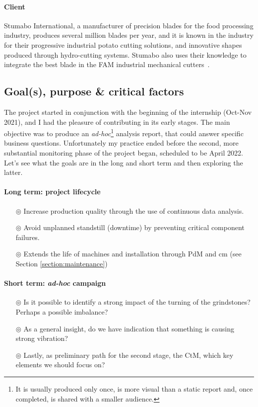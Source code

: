 \paragraph{Client} Stumabo International, a manufacturer of precision blades for the food processing industry, produces several million blades per year, 
and it is known in the industry for their progressive industrial potato cutting solutions, and innovative shapes produced through hydro-cutting systems.
Stumabo also uses their knowledge to integrate the best blade in the FAM industrial mechanical cutters~\cite{Misc:stumabo_en_website}.

\subsection{Goal(s), purpose \& critical factors}
The project started in conjunction with the beginning of the internship (Oct-Nov 2021), and I had the pleasure of contributing in its early stages.
The main objective was to produce an \textit{ad-hoc}\footnote{It is usually produced only once, is more visual than a static report and, once completed, is shared with a smaller audience.} 
analysis report, that could answer specific business questions.
Unfortunately my practice ended before the second, more substantial monitoring phase of the project began, scheduled to be April 2022.
Let's see what the goals are in the long and short term and then exploring the latter.
\paragraph{Long term: project lifecycle}
\begin{itemize}
    \item[$\circledcirc$] Increase production quality through the use of continuous data analysis.
    \item[$\circledcirc$] Avoid unplanned standstill (downtime) by preventing critical component failures.
    \item[$\circledcirc$] Extends the life of machines and installation through \acl{PdM} and \acl{cm} (see Section \ref{section:maintenance})
\end{itemize}
\paragraph{Short term: \textit{ad-hoc} campaign}
\begin{itemize}
    \item[$\circledcirc$] Is  it possible to identify a strong impact of the turning of the grindstones? Perhaps a possible imbalance?
    \item[$\circledcirc$] As a general insight, do we have indication that something is causing strong vibration?
    \item[$\circledcirc$] Lastly, as preliminary path for the second stage, the \ac{CtM}, which key elements we should focus on? 
\end{itemize}

